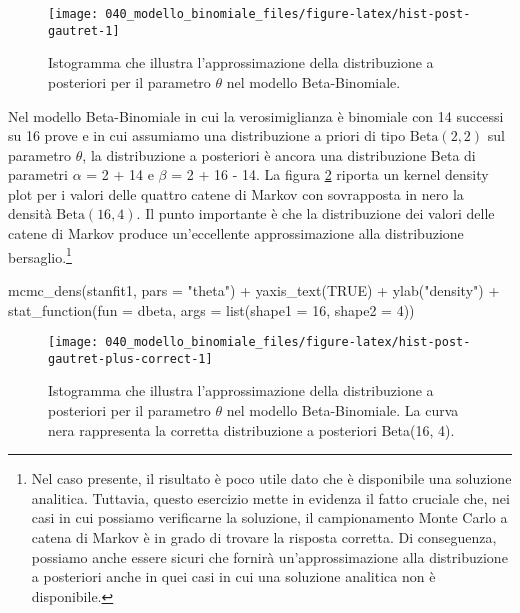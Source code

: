 \documentclass[
]{memoir}
\newenvironment{Shaded}{\begin{snugshade}}{\end{snugshade}}
\newcommand{\AttributeTok}[1]{\textcolor[rgb]{0.77,0.63,0.00}{#1}}
\newcommand{\ConstantTok}[1]{\textcolor[rgb]{0.00,0.00,0.00}{#1}}
\newcommand{\DecValTok}[1]{\textcolor[rgb]{0.00,0.00,0.81}{#1}}
\newcommand{\FunctionTok}[1]{\textcolor[rgb]{0.00,0.00,0.00}{#1}}
\newcommand{\NormalTok}[1]{#1}
\newcommand{\SpecialCharTok}[1]{\textcolor[rgb]{0.00,0.00,0.00}{#1}}
\newcommand{\StringTok}[1]{\textcolor[rgb]{0.31,0.60,0.02}{#1}}
\begin{document}
\begin{figure}

{\centering \texttt{[image: 040\_modello\_binomiale\_files/figure-latex/hist-post-gautret-1]} 

}

\caption{Istogramma che illustra l'approssimazione della distribuzione a posteriori per il parametro $\theta$ nel modello Beta-Binomiale.}\label{fig:hist-post-gautret}
\end{figure}

Nel modello Beta-Binomiale in cui la verosimiglianza è binomiale con 14 successi su 16 prove e in cui assumiamo una distribuzione a priori di tipo \(\mbox{Beta}(2, 2)\) sul parametro \(\theta\), la distribuzione a posteriori è ancora una distribuzione Beta di parametri \(\alpha\) = 2 + 14 e \(\beta\) = 2 + 16 - 14. La figura \ref{fig:hist-post-gautret-plus-correct} riporta un kernel density plot per i valori delle quattro catene di Markov con sovrapposta in nero la densità \(\mbox{Beta}(16, 4)\). Il punto importante è che la distribuzione dei valori delle catene di Markov produce un'eccellente approssimazione alla distribuzione bersaglio.\footnote{Nel caso presente, il risultato è poco utile dato che è disponibile una soluzione analitica. Tuttavia, questo esercizio mette in evidenza il fatto cruciale che, nei casi in cui possiamo verificarne la soluzione, il campionamento Monte Carlo a catena di Markov è in grado di trovare la risposta corretta. Di conseguenza, possiamo anche essere sicuri che fornirà un'approssimazione alla distribuzione a posteriori anche in quei casi in cui una soluzione analitica non è disponibile.}

\begin{Shaded}
\begin{Highlighting}[]
\FunctionTok{mcmc\_dens}\NormalTok{(stanfit1, }\AttributeTok{pars =} \StringTok{"theta"}\NormalTok{) }\SpecialCharTok{+}
  \FunctionTok{yaxis\_text}\NormalTok{(}\ConstantTok{TRUE}\NormalTok{) }\SpecialCharTok{+}
  \FunctionTok{ylab}\NormalTok{(}\StringTok{"density"}\NormalTok{) }\SpecialCharTok{+}
  \FunctionTok{stat\_function}\NormalTok{(}\AttributeTok{fun =}\NormalTok{ dbeta, }\AttributeTok{args =} \FunctionTok{list}\NormalTok{(}\AttributeTok{shape1 =} \DecValTok{16}\NormalTok{, }\AttributeTok{shape2 =} \DecValTok{4}\NormalTok{))}
\end{Highlighting}
\end{Shaded}

\begin{figure}

{\centering \texttt{[image: 040\_modello\_binomiale\_files/figure-latex/hist-post-gautret-plus-correct-1]} 

}

\caption{Istogramma che illustra l'approssimazione della distribuzione a posteriori per il parametro $\theta$ nel modello Beta-Binomiale. La curva nera rappresenta la corretta distribuzione a posteriori Beta(16, 4).}\label{fig:hist-post-gautret-plus-correct}
\end{figure}
\end{document}
